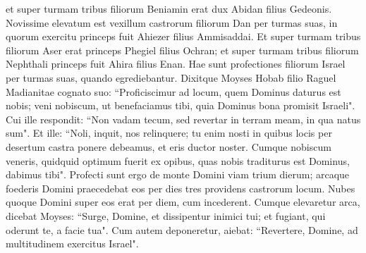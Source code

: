 \begin{biblechapter}
\verse et super turmam tribus filiorum Beniamin erat dux Abidan filius Gedeonis. 
\verse Novissime elevatum est vexillum castrorum filiorum Dan per turmas suas, in quorum exercitu princeps fuit Ahiezer filius Ammisaddai. 
\verse Et super turmam tribus filiorum Aser erat princeps Phegiel filius Ochran; 
\verse et super turmam tribus filiorum Nephthali princeps fuit Ahira filius Enan. 
\verse Hae sunt profectiones filiorum Israel per turmas suas, quando egrediebantur. 
\verse Dixitque Moyses Hobab filio Raguel Madianitae cognato suo: “Proficiscimur ad locum, quem Dominus daturus est nobis; veni nobiscum, ut benefaciamus tibi, quia Dominus bona promisit Israeli". 
\verse Cui ille respondit: “Non vadam tecum, sed revertar in terram meam, in qua natus sum". 
\verse Et ille: “Noli, inquit, nos relinquere; tu enim nosti in quibus locis per desertum castra ponere debeamus, et eris ductor noster. 
\verse Cumque nobiscum veneris, quidquid optimum fuerit ex opibus, quas nobis traditurus est Dominus, dabimus tibi". 
\verse Profecti sunt ergo de monte Domini viam trium dierum; arcaque foederis Domini praecedebat eos per dies tres providens castrorum locum. 
\verse Nubes quoque Domini super eos erat per diem, cum incederent. 
\verse Cumque elevaretur arca, dicebat Moyses: “Surge, Domine, et dissipentur inimici tui; et fugiant, qui oderunt te, a facie tua". 
\verse Cum autem deponeretur, aiebat: “Revertere, Domine, ad multitudinem exercitus Israel". 
\end{biblechapter}

